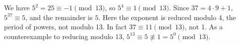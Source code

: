 We have $5^2=25\equiv-1\pmod{13}$, so $5^4\equiv1\pmod{13}$. Since $37=4\cdot9+1$, $5^{37}\equiv5$, and the remainder is $\boxed5$. Here the exponent is reduced modulo 4, the period of powers, not modulo 13. In fact $37\equiv11\pmod{13}$, not 1. As a counterexample to reducing modulo 13, $5^{13}\equiv5\not\equiv1=5^0\pmod{13}$.

